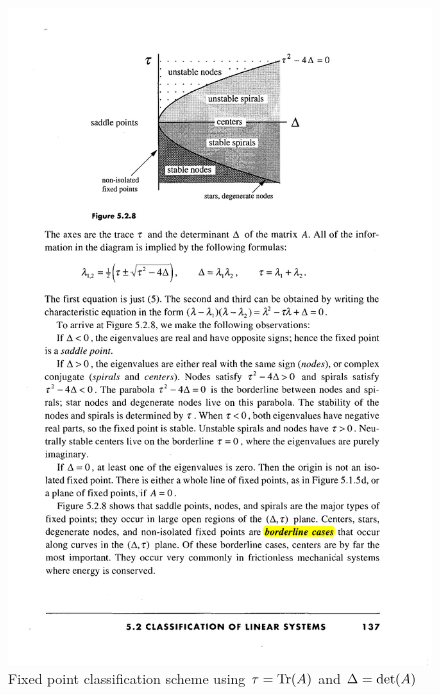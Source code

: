 {	\begin{figure} \centering
		\includegraphics{5-2-8}
		\caption{Fixed point classification scheme using $\tau = \Tr(A)$ and $\Delta = \det(A)$~\cite[p.~137]{Strogatz}}
		\label{para}
	\end{figure}
}

%
%
\clearpage
{}

